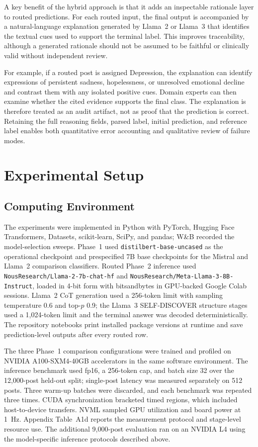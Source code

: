 \documentclass{ieeeaccess}
\begin{document}
A key benefit of the hybrid approach is that it adds an inspectable rationale layer to routed predictions. For each routed input, the final output is accompanied by a natural-language explanation generated by Llama~2 or Llama~3 that identifies the textual cues used to support the terminal label. This improves traceability, although a generated rationale should not be assumed to be faithful or clinically valid without independent review.

For example, if a routed post is assigned Depression, the explanation can identify expressions of persistent sadness, hopelessness, or unresolved emotional decline and contrast them with any isolated positive cues. Domain experts can then examine whether the cited evidence supports the final class. The explanation is therefore treated as an audit artifact, not as proof that the prediction is correct. Retaining the full reasoning fields, parsed label, initial prediction, and reference label enables both quantitative error accounting and qualitative review of failure modes.

\section{Experimental Setup}

\subsection{Computing Environment}

The experiments were implemented in Python with PyTorch, Hugging Face Transformers, Datasets, scikit-learn, SciPy, and pandas; W\&B recorded the model-selection sweeps. Phase~1 used \texttt{distilbert-base-uncased} as the operational checkpoint and prespecified 7B base checkpoints for the Mistral and Llama~2 comparison classifiers. Routed Phase~2 inference used \texttt{NousResearch/Llama-2-7b-chat-hf} and \texttt{NousResearch/Meta-Llama-3-8B-Instruct}, loaded in 4-bit form with bitsandbytes in GPU-backed Google Colab sessions. Llama~2 CoT generation used a 256-token limit with sampling temperature 0.6 and top-$p$ 0.9; the Llama~3 SELF-DISCOVER structure stages used a 1,024-token limit and the terminal answer was decoded deterministically. The repository notebooks print installed package versions at runtime and save prediction-level outputs after every routed row.

The three Phase~1 comparison configurations were trained and profiled on NVIDIA A100-SXM4-40GB accelerators in the same software environment. The inference benchmark used fp16, a 256-token cap, and batch size 32 over the 12,000-post held-out split; single-post latency was measured separately on 512 posts. Three warm-up batches were discarded, and each benchmark was repeated three times. CUDA synchronization bracketed timed regions, which included host-to-device transfers. NVML sampled GPU utilization and board power at 1~Hz. Appendix Table~A1d reports the measurement protocol and stage-level resource use. The additional 9,000-post evaluation ran on an NVIDIA L4 using the model-specific inference protocols described above.
\end{document}
